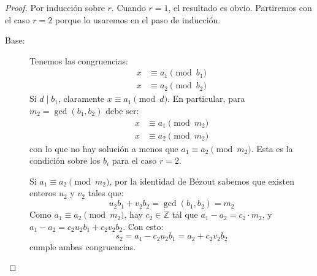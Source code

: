   \begin{proof}
    Por inducción sobre \(r\).%
    Cuando \(r = 1\),
    el resultado es obvio.
    Partiremos con el caso \(r = 2\)
    porque lo usaremos en el paso de inducción.
    \begin{description}
    \item[Base:]
      Tenemos las congruencias:
      \begin{align*}
	x &\equiv a_1 \pmod{b_1} \\
	x &\equiv a_2 \pmod{b_2}
      \end{align*}
      Si \(d \mid b_1\),
      claramente \(x \equiv a_1 \pmod{d}\).
      En particular,
      para \(m_2 = \gcd(b_1, b_2)\)
      debe ser:
      \begin{align*}
	x &\equiv a_1 \pmod{m_2} \\
	x &\equiv a_2 \pmod{m_2}
      \end{align*}
      con lo que no hay solución
      a menos que \(a_1 \equiv a_2 \pmod{m_2}\).
      Esta es la condición sobre los \(b_i\) para el caso \(r = 2\).

      Si \(a_1 \equiv a_2 \pmod{m_2}\),
      por la identidad de Bézout%
      sabemos que existen enteros \(u_2\) y \(v_2\) tales que:
      \begin{equation*}
	u_2 b_1 + v_2 b_2
	  = \gcd(b_1, b_2)
	  = m_2
      \end{equation*}
      Como \(a_1 \equiv a_2 \pmod{m_2}\),
      hay \(c_2 \in \mathbb{Z}\)
      tal que \(a_1 - a_2 = c_2 \cdot m_2\),
      y \(a_1 - a_2 = c_2 u_2 b_1 + c_2 v_2 b_2\).
      Con esto:
      \begin{equation*}
	s_2
	  = a_1 - c_2 u_2 b_1
	  = a_2 + c_2 v_2 b_2
      \end{equation*}
      cumple ambas congruencias.


\end{description}
\end{proof}
